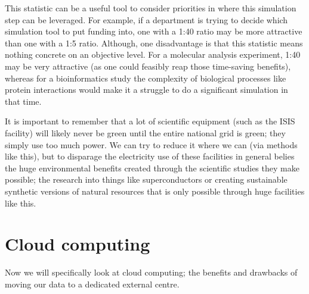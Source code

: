 \documentclass{article}
\begin{document}
This statistic can be a useful tool to consider priorities in where this simulation step can be leveraged. For example, if a department is trying to decide which simulation tool to put funding into, one with a 1:40 ratio may be more attractive than one with a 1:5 ratio. Although, one disadvantage is that this statistic means nothing concrete on an objective level. For a molecular analysis experiment, 1:40 may be very attractive (as one could feasibly reap those time-saving benefits), whereas for a bioinformatics study the complexity of biological processes like protein interactions would make it a struggle to do a significant simulation in that time. \newline

It is important to remember that a lot of scientific equipment (such as the ISIS facility) will likely never be green until the entire national grid is green; they simply use too much power. We can try to reduce it where we can (via methods like this), but to disparage the electricity use of these facilities in general belies the huge environmental benefits created through the scientific studies they make possible; the research into things like superconductors \citep{shang2018time} or creating sustainable synthetic versions of natural resources that is only possible through huge facilities like this.



\section{Cloud computing}
Now we will specifically look at cloud computing; the benefits and drawbacks of moving our data to a dedicated external centre.
\end{document}
